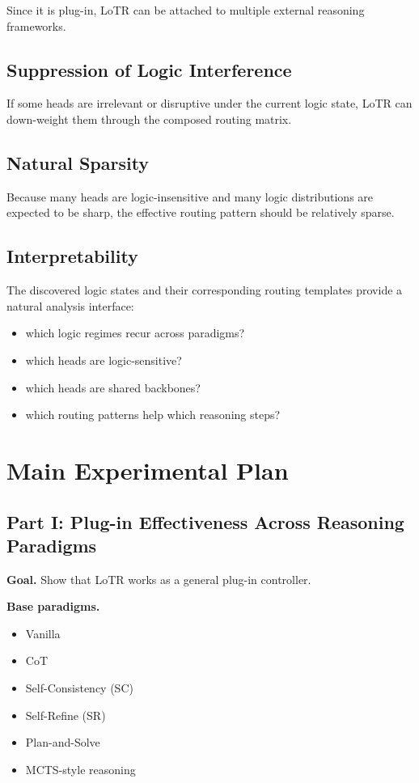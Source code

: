 \documentclass[11pt]{article}
\begin{document}
Since it is plug-in, LoTR can be attached to multiple external reasoning frameworks.

\subsection{Suppression of Logic Interference}

If some heads are irrelevant or disruptive under the current logic state, LoTR can down-weight them through the composed routing matrix.

\subsection{Natural Sparsity}

Because many heads are logic-insensitive and many logic distributions are expected to be sharp, the effective routing pattern should be relatively sparse.

\subsection{Interpretability}

The discovered logic states and their corresponding routing templates provide a natural analysis interface:
\begin{itemize}[leftmargin=1.5em]
    \item which logic regimes recur across paradigms?
    \item which heads are logic-sensitive?
    \item which heads are shared backbones?
    \item which routing patterns help which reasoning steps?
\end{itemize}

\section{Main Experimental Plan}

\subsection{Part I: Plug-in Effectiveness Across Reasoning Paradigms}

\textbf{Goal.} Show that LoTR works as a general plug-in controller.

\textbf{Base paradigms.}
\begin{itemize}[leftmargin=1.5em]
    \item Vanilla
    \item CoT
    \item Self-Consistency (SC)
    \item Self-Refine (SR)
    \item Plan-and-Solve
    \item MCTS-style reasoning
\end{itemize}
\end{document}
